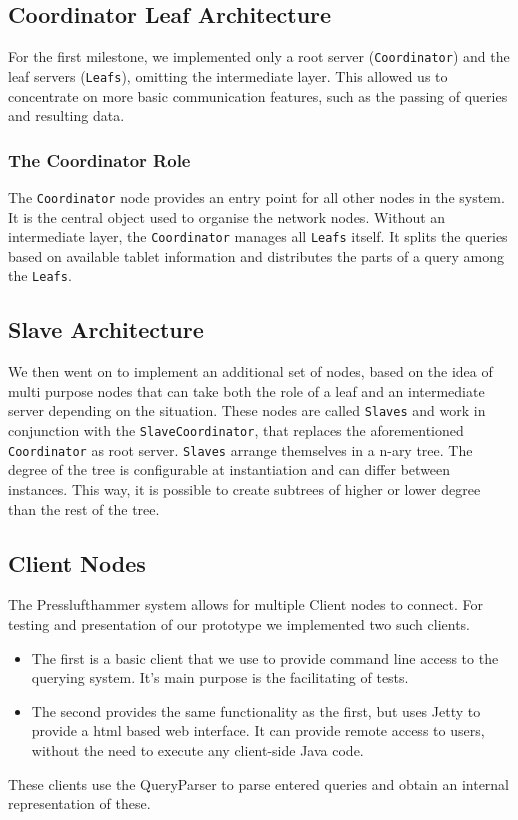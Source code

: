   \subsection{Coordinator Leaf Architecture}
    For the first milestone, we implemented only a root server
    (\texttt{Coordinator}) and the leaf servers (\texttt{Leafs}),
    omitting the intermediate layer.
    This allowed us to concentrate on more basic communication features,
    such as the passing of queries and resulting data.
    \subsubsection{The Coordinator Role}
      The \texttt{Coordinator} node provides an entry point for all other nodes
      in the system.
      It is the central object used to organise the network nodes.
      Without an intermediate layer, the \texttt{Coordinator} manages all
      \texttt{Leafs} itself. It splits the queries based on available tablet
      information and distributes the parts of a query among the \texttt{Leafs}.
    
    
  \subsection{Slave Architecture}
    We then went on to implement an additional set of nodes, based on the
    idea of multi purpose nodes that can take both the role of a leaf
    and an intermediate server depending on the situation.
    These nodes are called \texttt{Slaves} and work in conjunction with the
    \texttt{SlaveCoordinator}, that replaces the aforementioned 
    \texttt{Coordinator} as root server.
    \texttt{Slaves} arrange themselves in a n-ary tree.
    The degree of the tree is configurable at instantiation
    and can differ between instances.
    This way, it is possible to create subtrees of higher or lower degree
    than the rest of the tree.


  \subsection{Client Nodes}
    The Presslufthammer system allows for multiple Client nodes to connect.
    For testing and presentation of our prototype we implemented two such
    clients.
    \begin{itemize}
      \item The first is a basic client that we use to provide command
            line access to the querying system.
            It's main purpose is the facilitating of tests.
      \item The second provides the same functionality as the first,
            but uses Jetty \cite{jetty} to provide a html based web
            interface.
            It can provide remote access to users, without the need
            to execute any client-side Java code.
    \end{itemize}
    These clients use the QueryParser to parse entered queries and obtain
    an internal representation of these.


